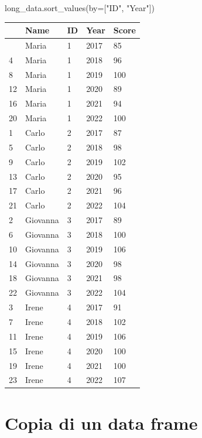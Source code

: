 \documentclass[
  letterpaper,
  krantz2]{{[}./krantz{]}}
\newenvironment{Shaded}{\begin{snugshade}}{\end{snugshade}}
\newcommand{\NormalTok}[1]{\textcolor[rgb]{0.00,0.23,0.31}{#1}}
\newcommand{\OperatorTok}[1]{\textcolor[rgb]{0.37,0.37,0.37}{#1}}
\newcommand{\StringTok}[1]{\textcolor[rgb]{0.13,0.47,0.30}{#1}}
\begin{document}
\begin{Shaded}
\begin{Highlighting}[]
\NormalTok{long\_data.sort\_values(by}\OperatorTok{=}\NormalTok{[}\StringTok{"ID"}\NormalTok{, }\StringTok{"Year"}\NormalTok{])}
\end{Highlighting}
\end{Shaded}

\begin{longtable}[]{@{}lllll@{}}
\toprule\noalign{}
& Name & ID & Year & Score \\
\midrule\noalign{}
\endhead
\bottomrule\noalign{}
\endlastfoot
0 & Maria & 1 & 2017 & 85 \\
4 & Maria & 1 & 2018 & 96 \\
8 & Maria & 1 & 2019 & 100 \\
12 & Maria & 1 & 2020 & 89 \\
16 & Maria & 1 & 2021 & 94 \\
20 & Maria & 1 & 2022 & 100 \\
1 & Carlo & 2 & 2017 & 87 \\
5 & Carlo & 2 & 2018 & 98 \\
9 & Carlo & 2 & 2019 & 102 \\
13 & Carlo & 2 & 2020 & 95 \\
17 & Carlo & 2 & 2021 & 96 \\
21 & Carlo & 2 & 2022 & 104 \\
2 & Giovanna & 3 & 2017 & 89 \\
6 & Giovanna & 3 & 2018 & 100 \\
10 & Giovanna & 3 & 2019 & 106 \\
14 & Giovanna & 3 & 2020 & 98 \\
18 & Giovanna & 3 & 2021 & 98 \\
22 & Giovanna & 3 & 2022 & 104 \\
3 & Irene & 4 & 2017 & 91 \\
7 & Irene & 4 & 2018 & 102 \\
11 & Irene & 4 & 2019 & 106 \\
15 & Irene & 4 & 2020 & 100 \\
19 & Irene & 4 & 2021 & 100 \\
23 & Irene & 4 & 2022 & 107 \\
\end{longtable}

\section{Copia di un data frame}\label{copia-di-un-data-frame}
\end{document}
